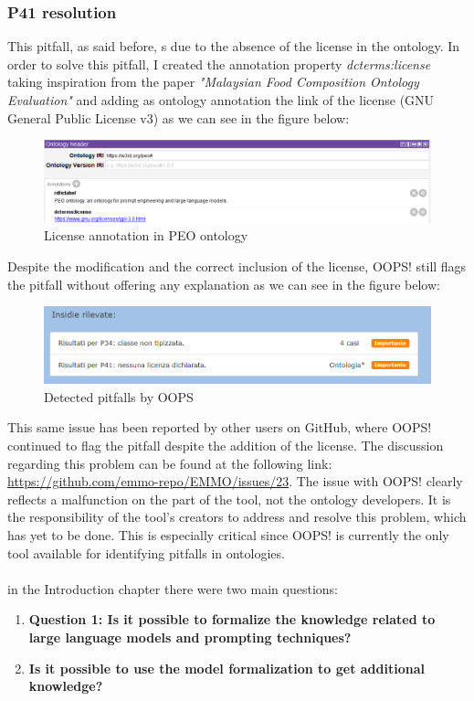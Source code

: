 \subsubsection{P41 resolution}
This pitfall, as said before, s due to the absence of the license in the ontology. In order to solve this pitfall, I created the annotation property \textit{dcterms:license} taking inspiration from the paper \textit{"Malaysian Food Composition Ontology Evaluation"}\cite{yusof2019malaysian} and adding as ontology annotation the link of the license (GNU General Public License v3) as we can see in the figure below:
\begin{figure}[H]
    \centering
    \includegraphics[width=0.9\linewidth]{Figures/fig_79.png}
    \caption{License annotation in PEO ontology}
    \label{fig:enter-label}
\end{figure}

Despite the modification and the correct inclusion of the license, OOPS! still flags the pitfall without offering any explanation as we can see in the figure below:
\begin{figure}[H]
    \centering
    \includegraphics[width=0.9\linewidth]{Figures/fig_80.png}
    \caption{Detected pitfalls by OOPS}
    \label{fig:enter-label}
\end{figure}

This same issue has been reported by other users on GitHub, where OOPS! continued to flag the pitfall despite the addition of the license. The discussion regarding this problem can be found at the following link:\\ \href{https://github.com/emmo-repo/EMMO/issues/23}{https://github.com/emmo-repo/EMMO/issues/23}.
The issue with OOPS! clearly reflects a malfunction on the part of the tool, not the ontology developers. It is the responsibility of the tool's creators to address and resolve this problem, which has yet to be done. This is especially critical since OOPS! is currently the only tool available for identifying pitfalls in ontologies.\\\\
in the Introduction chapter there were two main questions:
\begin{enumerate}
    \item \textbf{Question 1: Is it possible to formalize the knowledge related to large language models and prompting techniques?}

    \item \textbf{ Is it possible to use the model formalization to get additional knowledge?}
\end{enumerate}

